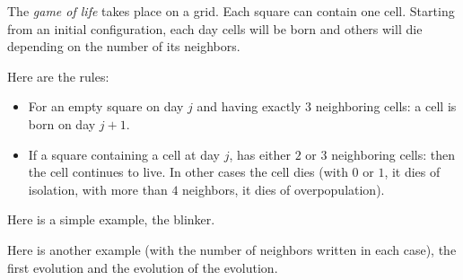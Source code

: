 \documentclass[11pt,class=report,crop=false]{standalone}
\begin{document}
\begin{cours}
The \emph{game of life} takes place on a grid. Each square can contain one cell. Starting from an initial configuration, each day cells will be born and others will die depending on the number of its neighbors.

Here are the rules:
\begin{itemize}
  \item For an empty square on day $j$ and having exactly $3$ neighboring cells: a cell is born on day $j+1$.


  \item If a square containing a cell at day $j$, has either $2$ or $3$ neighboring cells: then the cell continues to live.
  In other cases the cell dies (with $0$ or $1$, it dies of isolation, with more than $4$ neighbors, it dies of overpopulation).
  
  \medskip
  

   \medskip
    
\end{itemize}

Here is a simple example, the \og{}blinker\fg{}.

 
Here is another example (with the number of neighbors written in each case), the first evolution and the evolution of the evolution.

\end{cours}



\end{document}
